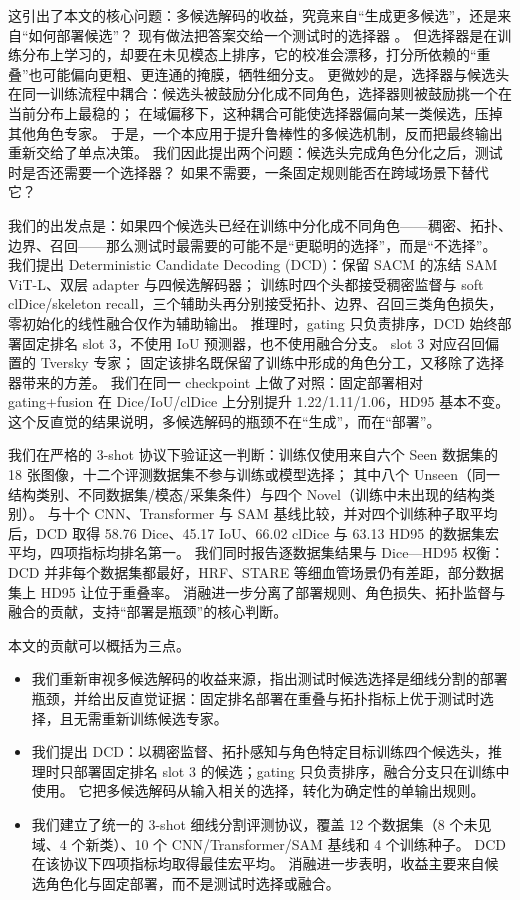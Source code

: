这引出了本文的核心问题：多候选解码的收益，究竟来自“生成更多候选”，还是来自“如何部署候选”？
现有做法把答案交给一个测试时的选择器 \cite{zhu2026sacm}。
但选择器是在训练分布上学习的，却要在未见模态上排序，它的校准会漂移，打分所依赖的“重叠”也可能偏向更粗、更连通的掩膜，牺牲细分支。
更微妙的是，选择器与候选头在同一训练流程中耦合：候选头被鼓励分化成不同角色，选择器则被鼓励挑一个在当前分布上最稳的；
在域偏移下，这种耦合可能使选择器偏向某一类候选，压掉其他角色专家。
于是，一个本应用于提升鲁棒性的多候选机制，反而把最终输出重新交给了单点决策。
我们因此提出两个问题：候选头完成角色分化之后，测试时是否还需要一个选择器？ 如果不需要，一条固定规则能否在跨域场景下替代它？



我们的出发点是：如果四个候选头已经在训练中分化成不同角色——稠密、拓扑、边界、召回——那么测试时最需要的可能不是“更聪明的选择”，而是“不选择”。
我们提出 Deterministic Candidate Decoding (DCD)：保留 SACM 的冻结 SAM ViT-L、双层 adapter 与四候选解码器；
训练时四个头都接受稠密监督与 soft clDice/skeleton recall，三个辅助头再分别接受拓扑、边界、召回三类角色损失，零初始化的线性融合仅作为辅助输出。
推理时，gating 只负责排序，DCD 始终部署固定排名 slot 3，不使用 IoU 预测器，也不使用融合分支。
slot 3 对应召回偏置的 Tversky 专家；
固定该排名既保留了训练中形成的角色分工，又移除了选择器带来的方差。
我们在同一 checkpoint 上做了对照：固定部署相对 gating+fusion 在 Dice/IoU/clDice 上分别提升 1.22/1.11/1.06，HD95 基本不变。
这个反直觉的结果说明，多候选解码的瓶颈不在“生成”，而在“部署”。




我们在严格的 3-shot 协议下验证这一判断：训练仅使用来自六个 Seen 数据集的18 张图像，十二个评测数据集不参与训练或模型选择；
其中八个 Unseen（同一结构类别、不同数据集/模态/采集条件）与四个 Novel（训练中未出现的结构类别）。
与十个 CNN、Transformer 与 SAM 基线比较，并对四个训练种子取平均后，DCD 取得 58.76 Dice、45.17 IoU、66.02 clDice 与 63.13 HD95 的数据集宏平均，四项指标均排名第一。
我们同时报告逐数据集结果与 Dice—HD95 权衡：DCD 并非每个数据集都最好，HRF、STARE 等细血管场景仍有差距，部分数据集上 HD95 让位于重叠率。
消融进一步分离了部署规则、角色损失、拓扑监督与融合的贡献，支持“部署是瓶颈”的核心判断。

本文的贡献可以概括为三点。
\begin{itemize}
\item 我们重新审视多候选解码的收益来源，指出测试时候选选择是细线分割的部署瓶颈，并给出反直觉证据：固定排名部署在重叠与拓扑指标上优于测试时选择，且无需重新训练候选专家。
\item 我们提出 DCD：以稠密监督、拓扑感知与角色特定目标训练四个候选头，推理时只部署固定排名 slot 3 的候选；gating 只负责排序，融合分支只在训练中使用。
      它把多候选解码从输入相关的选择，转化为确定性的单输出规则。
\item 我们建立了统一的 3-shot 细线分割评测协议，覆盖 12 个数据集（8 个未见域、4 个新类）、10 个 CNN/Transformer/SAM 基线和 4 个训练种子。
      DCD 在该协议下四项指标均取得最佳宏平均。
      消融进一步表明，收益主要来自候选角色化与固定部署，而不是测试时选择或融合。
\end{itemize}
